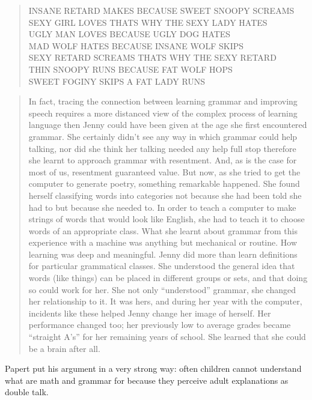 \begin{quote}
INSANE RETARD MAKES BECAUSE SWEET SNOOPY SCREAMS\\
SEXY GIRL LOVES THATS WHY THE SEXY LADY HATES\\
UGLY MAN LOVES BECAUSE UGLY DOG HATES\\
MAD WOLF HATES BECAUSE INSANE WOLF SKIPS\\
SEXY RETARD SCREAMS THATS WHY THE SEXY RETARD\\
THIN SNOOPY RUNS BECAUSE FAT WOLF HOPS\\
SWEET FOGINY SKIPS A FAT LADY RUNS\\
\end{quote}

\begin{quote}
In fact, tracing the connection between learning grammar and improving speech requires a more distanced view of the complex process of learning language then Jenny could have been given at the age she first encountered grammar. She certainly didn't see any way in which grammar could help talking, nor did she think her talking needed any help full stop  therefore she learnt to approach grammar with resentment. And, as is the case for most of us, resentment guaranteed value. But now, as she tried to get the computer to generate poetry, something remarkable happened.  She found herself classifying words into categories not because she had been told she had to but because she needed to. In order to teach a computer to make strings of words that would look like English, she had to teach it to choose words of an appropriate class. What she learnt about grammar from this experience with a machine was anything but mechanical or routine. How learning was deep and meaningful.  Jenny did more than learn definitions for particular grammatical classes. She understood the general idea that words (like things) can be placed in different groups or sets, and that doing so could work for her. She not only “understood” grammar, she changed her relationship to it. It was hers, and during her year with the computer, incidents like these helped Jenny change her image of herself.  Her performance changed too; her previously low to average grades became “straight A's” for her remaining years of school. She learned that she could be a brain after all.
\end{quote}

Papert put his argument in a very strong way: often children cannot understand what are math and grammar for because they perceive adult explanations as double talk.

